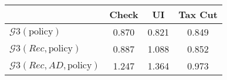 \begin{tabular}{@{}lccc@{}} 
\toprule 
                          & Check      & UI    & Tax Cut    \\  \midrule 
$\mathcal{G}3(\text{policy})$ & 0.870  & 0.821  & 0.849     \\ 
$\mathcal{G}3(Rec,\text{policy})$ & 0.887  & 1.088  & 0.852     \\ 
$\mathcal{G}3(Rec, AD,\text{policy})$ & 1.247  & 1.364  & 0.973     \\ 
\end{tabular}  
